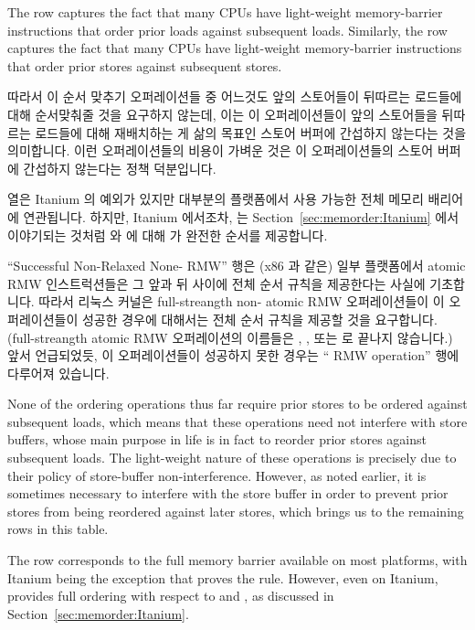{	The  row captures the fact that many CPUs have
	light-weight memory-barrier instructions that order prior loads against
	subsequent loads.
	Similarly,
	the  row captures the fact that many CPUs have
	light-weight memory-barrier instructions that order prior stores against
	subsequent stores.
	\fi

	따라서 이 순서 맞추기 오퍼레이션들 중 어느것도 앞의 스토어들이 뒤따르는
	로드들에 대해 순서맞춰줄 것을 요구하지 않는데, 이는 이 오퍼레이션들이
	앞의 스토어들을 뒤따르는 로드들에 대해 재배치하는 게 삶의 목표인 스토어
	버퍼에 간섭하지 않는다는 것을 의미합니다.
	이런 오퍼레이션들의 비용이 가벼운 것은 이 오퍼레이션들의 스토어 버퍼에
	간섭하지 않는다는 정책 덕분입니다.

	 열은 Itanium 의 예외가 있지만 대부분의 플랫폼에서 사용
	가능한 전체 메모리 배리어에 연관됩니다.
	하지만, Itanium 에서조차,  는
	Section~\ref{sec:memorder:Itanium} 에서 이야기되는 것처럼
	 와  에 대해  가 완전한
	순서를 제공합니다.

	``Successful Non-Relaxed None- RMW'' 행은 (x86 과 같은) 일부
	플랫폼에서 atomic RMW 인스트럭션들은 그 앞과 뒤 사이에 전체 순서 규칙을
	제공한다는 사실에 기초합니다.
	따라서 리눅스 커널은 full-streangth non- atomic RMW
	오퍼레이션들이 이 오퍼레이션들이 성공한 경우에 대해서는 전체 순서
	규칙을 제공할 것을 요구합니다.
	(full-streangth atomic RMW 오퍼레이션의 이름들은 ,
	, 또는  로 끝나지 않습니다.)
	앞서 언급되었듯, 이 오퍼레이션들이 성공하지 못한 경우는
	`` RMW operation'' 행에 다루어져 있습니다.
	\iffalse

	None of the ordering operations thus far require prior stores to be
	ordered against subsequent loads, which means that these operations
	need not interfere with store buffers, whose main purpose in life
	is in fact to reorder prior stores against subsequent loads.
	The light-weight nature of these operations is precisely due to
	their policy of store-buffer non-interference.
	However, as noted earlier, it is sometimes necessary to interfere
	with the store buffer in order to prevent prior stores from being
	reordered against later stores, which brings us to the remaining
	rows in this table.

	The  row corresponds to the full memory barrier
	available on most platforms, with Itanium being the exception
	that proves the rule.
	However, even on Itanium,  provides full ordering
	with respect to  and ,
	as discussed in Section~\ref{sec:memorder:Itanium}.

}
